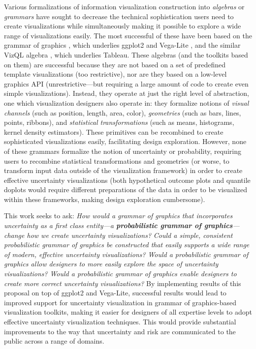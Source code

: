 \documentclass[11pt]{article}
\begin{document}
Various formalizations of information visualization construction into \emph{algebras} \cite{bertin1983semiology, mackinlay1986automating} or \emph{grammars} \cite{wilkinson_grammar_2005} have sought to decrease the technical sophistication users need to create visualizations while simultaneously making it possible to explore a wide range of visualizations easily. The most successful of these have been based on the grammar of graphics \cite{wilkinson_grammar_2005}, which underlies ggplot2 \cite{Wickham2010layered_grammar, wickham2016ggplot2} and Vega-Lite \cite{Satyanarayan2017vegalite}, and the similar VizQL algebra \cite{mackinlay2007show}, which underlies Tableau. These algebras (and the toolkits based on them) are successful because they are not based on a set of predefined template visualizations (too restrictive), nor are they based on a low-level graphics API (unrestrictive---but requiring a large amount of code to create even simple visualizations). Instead, they operate at just the right level of abstraction, one which visualization designers also operate in: they formalize notions of \emph{visual channels} (such as position, length, area, color), \emph{geometries} (such as bars, lines, points, ribbons), and \emph{statistical transformations} (such as means, histograms, kernel density estimators). These primitives can be recombined to create sophisticated visualizations easily, facilitating design exploration. However, none of these grammars formalize the notion of uncertainty or probability, requiring users to recombine statistical transformations and geometries (or worse, to transform input data outside of the visualization framework) in order to create effective uncertainty visualizations (both hypothetical outcome plots \cite{hullman2015hops, kale2018hypothetical} and quantile doplots \cite{kay2016bus, Fernandes2018} would require different preparations of the data in order to be visualized within these frameworks, making design exploration cumbersome).

This work seeks to ask: \emph{How would a grammar of graphics that incorporates uncertainty as a first class entity---a \textbf{probabilistic grammar of graphics}---change how we create uncertainty visualizations?} \emph{Could a simple, consistent probabilistic grammar of graphics be constructed that easily supports a wide range of modern, effective uncertainty visualizations?} \emph{Would a probabilistic grammar of graphics allow designers to more easily explore the space of uncertainty visualizations?} \emph{Would a probabilistic grammar of graphics enable designers to create more correct uncertainty visualizations?} By implementing results of this proposal on top of ggplot2 and Vega-Lite, successful results would lead to improved support for uncertainty visualization in grammar of graphics-based visualization toolkits, making it easier for designers of all expertise levels to adopt effective uncertainty visualization techniques. This would provide substantial improvements to the way that uncertainty and risk are communicated to the public across a range of domains.
\end{document}
